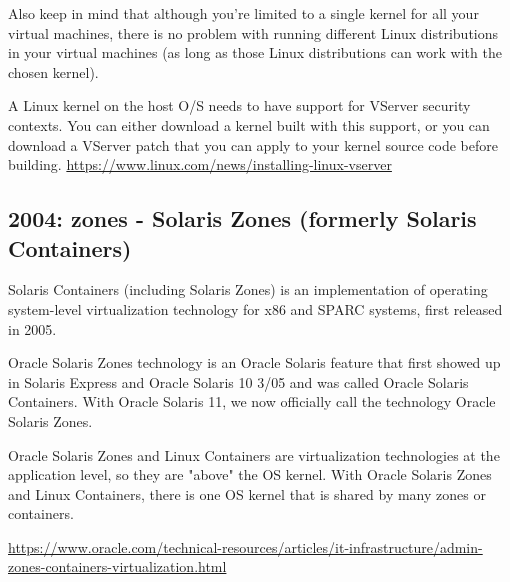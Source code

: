 Also keep in mind that although you're limited to a single kernel for all your
virtual machines, there is no problem with running different Linux distributions
in your virtual machines (as long as those Linux distributions can work with the
chosen kernel).


A Linux kernel on the host O/S needs to have support for VServer security
contexts. You can either download a kernel built with this support, or you can
download a VServer patch that you can apply to your kernel source code before
building.
\url{https://www.linux.com/news/installing-linux-vserver}
 
 
\subsection{2004: zones -  Solaris Zones (formerly Solaris Containers)}
\label{sec:zones-Solaris}

Solaris Containers (including Solaris Zones) is an implementation of operating
system-level virtualization technology for x86 and SPARC systems, first released in 2005.

Oracle Solaris Zones technology is an Oracle Solaris feature that first showed
up in Solaris Express and Oracle Solaris 10 3/05 and was called Oracle Solaris
Containers. With Oracle Solaris 11, we now officially call the technology Oracle
Solaris Zones.


Oracle Solaris Zones and Linux Containers are virtualization technologies at the
application level, so they are "above" the OS kernel. With Oracle Solaris Zones
and Linux Containers, there is one OS kernel that is shared by many zones or
containers.

\url{https://www.oracle.com/technical-resources/articles/it-infrastructure/admin-zones-containers-virtualization.html}

